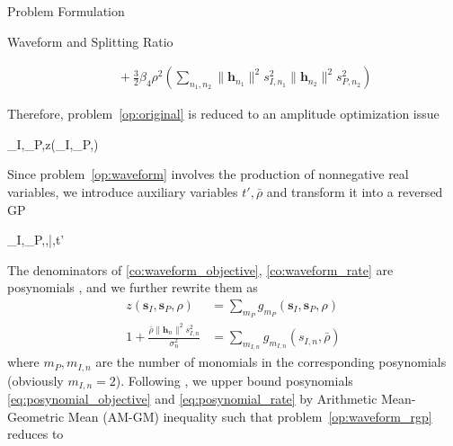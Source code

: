 \documentclass[journal]{IEEEtran}
\begin{document}
\begin{section}{Problem Formulation}
\begin{subsection}{Waveform and Splitting Ratio}
\begin{figure*}[b]
\begin{equation}
\begin{split}
						& \quad + \frac{3}{2}{\beta_4}{\rho^2} \left( \sum_{n_1,n_2} \lVert{\boldsymbol{h}_{n_1}}\rVert^2 s_{I,{n_1}}^2 \lVert{\boldsymbol{h}_{n_2}}\rVert^2 s_{P,{n_2}}^2 \right)
					\end{split}
				\end{equation}
			\end{figure*}
			Therefore, problem~\ref{op:original} is reduced to an amplitude optimization issue
			\begin{maxi!}
				{\boldsymbol{s}_I,_P,\rho}{z(\boldsymbol{s}_I,_P,\rho)}{\label{op:waveform}}{}
			\end{maxi!}
			Since problem~\ref{op:waveform} involves the production of nonnegative real variables, we introduce auxiliary variables $t',\bar{\rho}$ and transform it into a reversed GP
			\begin{mini!}
				{\boldsymbol{s}_I,_P,\rho,\bar{\rho},t'}{}{\label{op:waveform_rgp}}{}
				\label{co:waveform_power}
				\label{co:waveform_objective}
				\label{co:waveform_rate}
			\end{mini!}
			The denominators of \ref{co:waveform_objective}, \ref{co:waveform_rate} are posynomials \cite{Boyd2007}, and we further rewrite them as
			\begin{align}
				z(\boldsymbol{s}_I,\boldsymbol{s}_P,\rho)&=\sum_{m_P}{g_{m_P}(\boldsymbol{s}_I,\boldsymbol{s}_P,\rho)}\label{eq:posynomial_objective}\\
				1+\frac{\bar{\rho}\lVert{\boldsymbol{h}_n}\rVert^2 s_{I,n}^2}{\sigma_n^2}&=\sum_{m_{I,n}}g_{m_{I,n}}(s_{I,n},\bar{\rho})\label{eq:posynomial_rate}
			\end{align}
			where $m_P,m_{I,n}$ are the number of monomials in the corresponding posynomials (obviously $m_{I,n}=2$). Following \cite{Clerckx2018b,Chiang2005}, we upper bound posynomials \ref{eq:posynomial_objective} and \ref{eq:posynomial_rate} by Arithmetic Mean-Geometric Mean (AM-GM) inequality such that problem~\ref{op:waveform_rgp} reduces to

\end{subsection}
\end{section}
\end{document}
